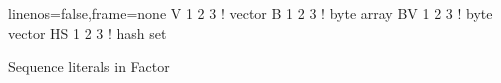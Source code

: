 \centering
\begin{minipage}{0.5\textwidth}
\begin{factorcode*}{linenos=false,frame=none}
  V{ 1 2 3 }  ! vector
  B{ 1 2 3 }  ! byte array
  BV{ 1 2 3 } ! byte vector
  HS{ 1 2 3 } ! hash set
\end{factorcode*}
\end{minipage}

\caption{Sequence literals in Factor}
